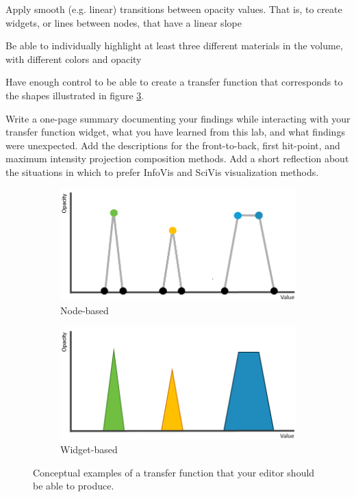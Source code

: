 \documentclass{labinstructions}
\begin{document}
\begin{todolist}
\begin{todolist}
    \item Apply smooth (e.g. linear) transitions between opacity values. That is, to create widgets, or lines between nodes, that have a linear slope
    \item Be able to individually highlight at least three different materials in the volume, with different colors and opacity
    \item Have enough control to be able to create a transfer function that corresponds to the shapes illustrated in figure \ref{fig:tf-examples}.
  \end{todolist}
  \item Write a one-page summary documenting your findings while interacting with your transfer function widget, what you have learned from this lab, and what findings were unexpected.  Add the descriptions for the front-to-back, first hit-point, and maximum intensity projection composition methods.  Add a short reflection about the situations in which to prefer InfoVis and SciVis visualization methods. 
\end{todolist}

\begin{figure}
\centering
\begin{subfigure}{.5\textwidth}
  \centering
  \includegraphics[width=.7\linewidth]{images/TF_node.png}
  \caption{Node-based}
  \label{fig:sub1}
\end{subfigure}%
\begin{subfigure}{.5\textwidth}
  \centering
  \includegraphics[width=.7\linewidth]{images/TF_widget.png}
  \caption{Widget-based}
  \label{fig:sub2}
\end{subfigure}
\caption{Conceptual examples of a transfer function that your editor should be able to produce.}
\label{fig:tf-examples}
\end{figure}
\end{document}
